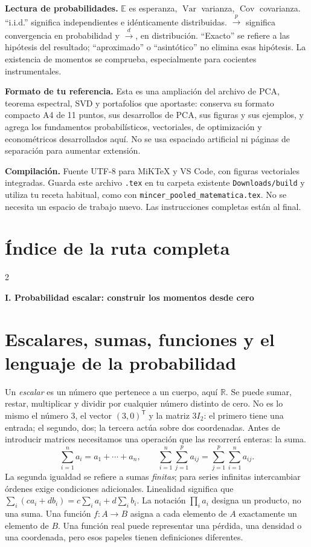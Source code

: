 \documentclass[11pt,a4paper]{article}
\newcommand{\R}{\mathbb R}
\newcommand{\E}{\mathbb E}
\newcommand{\T}{^{\mathsf T}}
\DeclareMathOperator{\Var}{Var}
\DeclareMathOperator{\Cov}{Cov}
\theoremstyle{definition}
\newcommand{\parte}[1]{\par\bigskip\Needspace{8\baselineskip}\begin{center}{\Large\bfseries\color{azul}#1}\end{center}}
\begin{document}
\textbf{Lectura de probabilidades.} $\E$ es esperanza, $\Var$ varianza, $\Cov$ covarianza. ``i.i.d.'' significa independientes e idénticamente distribuidas. $\xrightarrow p$ significa convergencia en probabilidad y $\xrightarrow d$, en distribución. ``Exacto'' se refiere a las hipótesis del resultado; ``aproximado'' o ``asintótico'' no elimina esas hipótesis. La existencia de momentos se comprueba, especialmente para cocientes instrumentales.

\textbf{Formato de tu referencia.} Esta es una ampliación del archivo de PCA, teorema espectral, SVD y portafolios que aportaste: conserva su formato compacto A4 de 11 puntos, sus desarrollos de PCA, sus figuras y sus ejemplos, y agrega los fundamentos probabilísticos, vectoriales, de optimización y econométricos desarrollados aquí. No se usa espaciado artificial ni páginas de separación para aumentar extensión.

\textbf{Compilación.} Fuente UTF-8 para MiKTeX y VS Code, con figuras vectoriales integradas. Guarda este archivo \texttt{.tex} en tu carpeta existente \texttt{Downloads/build} y utiliza tu receta habitual, como con \texttt{mincer\_pooled\_matematica.tex}. No se necesita un espacio de trabajo nuevo. Las instrucciones completas están al final.

\setcounter{tocdepth}{1}
\section*{Índice de la ruta completa}
\begin{multicols}{2}\footnotesize\setlength{\parskip}{0pt}
\makeatletter
\renewcommand*\l@section[2]{\@dottedtocline{1}{0pt}{2.4em}{#1}{#2}}
\makeatother
\end{multicols}
\parte{I. Probabilidad escalar: construir los momentos desde cero}
\section{Escalares, sumas, funciones y el lenguaje de la probabilidad}
Un \emph{escalar} es un número que pertenece a un cuerpo, aquí $\R$. Se puede sumar, restar, multiplicar y dividir por cualquier número distinto de cero. No es lo mismo el número $3$, el vector $(3,0)\T$ y la matriz $3I_2$: el primero tiene una entrada; el segundo, dos; la tercera actúa sobre dos coordenadas. Antes de introducir matrices necesitamos una operación que las recorrerá enteras: la suma.
\[
\sum_{i=1}^n a_i=a_1+\cdots+a_n,\qquad
\sum_{i=1}^n\sum_{j=1}^p a_{ij}=\sum_{j=1}^p\sum_{i=1}^n a_{ij}.
\]
La segunda igualdad se refiere a sumas \emph{finitas}; para series infinitas intercambiar órdenes exige condiciones adicionales. Linealidad significa que $\sum_i(ca_i+db_i)=c\sum_i a_i+d\sum_i b_i$. La notación $\prod_i a_i$ designa un producto, no una suma. Una función $f:A\to B$ asigna a cada elemento de $A$ exactamente un elemento de $B$. Una función real puede representar una pérdida, una densidad o una coordenada, pero esos papeles tienen definiciones diferentes.
\end{document}
